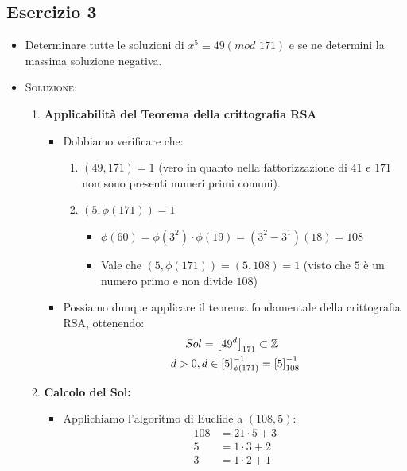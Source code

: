 \documentclass[10pt]{article}
\begin{document}
	\subsection{Esercizio 3}
		\begin{itemize}
		\item
		Determinare tutte le soluzioni di $x^5 \equiv 49(mod \,\, 171)$ e se ne determini la massima soluzione negativa.
		\item
		\textsc{Soluzione:}
		\begin{enumerate}
		\item
		\textbf{Applicabilità del Teorema della crittografia RSA}
		\begin{itemize}
		\item
		Dobbiamo verificare che:
		\begin{enumerate}
		\item
		$(49,171) = 1$ (vero in quanto nella fattorizzazione di $41$ e $171$ non sono presenti numeri primi comuni).
		\item
		$(5,\phi(171)) =  1$
		\begin{itemize}
		\item
		$\phi(60) = \phi(3^2) \cdot \phi(19) = (3^2 - 3^1)(18) = 108$
		\item
		Vale che $(5,\phi(171)) = (5,108) = 1$ (visto che $5$ è un numero primo e non divide $108$)
		\end{itemize}
		\end{enumerate}
		\item
		Possiamo dunque applicare il teorema fondamentale della crittografia RSA, ottenendo:
		\begin{equation}
		\begin{split}
		Sol &= \left[49^d\right]_{171} \subset \mathbb{Z} \\
		d>0,\, &d \in \left[5\right]_{\phi(171)}^{-1} = \left[5\right]_{108}^{-1} 
		\notag
		\end{split}
		\end{equation}
		\end{itemize}
		\item
		\textbf{Calcolo del Sol:}
		\begin{itemize}
		\item
		Applichiamo l'algoritmo di Euclide a $(108,5)$:
		\begin{equation}
		\begin{split}
		108 &= 21 \cdot 5 + 3 \\
		5 &= 1 \cdot 3 + 2 \\
		3 &= 1 \cdot 2 + 1 \\	

\end{split}
\end{equation}
\end{itemize}
\end{enumerate}
\end{itemize}
\end{document}
